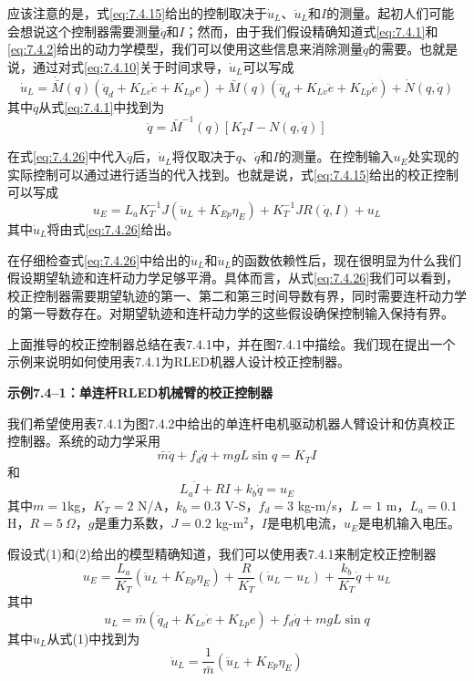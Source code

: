 \documentclass[UTF8]{ctexart}
\begin{document}
应该注意的是，式\eqref{eq:7.4.15}给出的控制取决于$\dot{u}_L$、$\ddot{u}_L$和$I$的测量。起初人们可能会想说这个控制器需要测量$\ddot{q}$和$I$；然而，由于我们假设精确知道式\eqref{eq:7.4.1}和\eqref{eq:7.4.2}给出的动力学模型，我们可以使用这些信息来消除测量$\ddot{q}$的需要。也就是说，通过对式\eqref{eq:7.4.10}关于时间求导，$\dot{u}_L$可以写成
\begin{equation}\label{eq:7.4.26}
\dot{u}_L = \dot{\bar{M}}(q)(\ddot{q}_d + K_{Lv}\dot{e} + K_{Lp}e) + \bar{M}(q)(\dddot{q}_d + K_{Lv}\ddot{e} + K_{Lp}\dot{e}) + \dot{N}(q,\dot{q})
\end{equation}
其中$\ddot{q}$从式\eqref{eq:7.4.1}中找到为
\begin{equation*}
\ddot{q} = \bar{M}^{-1}(q)[K_T I - N(q,\dot{q})]
\end{equation*}

在式\eqref{eq:7.4.26}中代入$\ddot{q}$后，$\dot{u}_L$将仅取决于$q$、$\dot{q}$和$I$的测量。在控制输入$u_E$处实现的实际控制可以通过进行适当的代入找到。也就是说，式\eqref{eq:7.4.15}给出的校正控制可以写成
\begin{equation}\label{eq:7.4.27}
u_E = L_a K_T^{-1}J(\ddot{u}_L + K_{Ep}\eta_E) + K_T^{-1}JR(\dot{q},I) + u_L
\end{equation}
其中$\dot{u}_L$将由式\eqref{eq:7.4.26}给出。

在仔细检查式\eqref{eq:7.4.26}中给出的$\dot{u}_L$和$\ddot{u}_L$的函数依赖性后，现在很明显为什么我们假设期望轨迹和连杆动力学足够平滑。具体而言，从式\eqref{eq:7.4.26}我们可以看到，校正控制器需要期望轨迹的第一、第二和第三时间导数有界，同时需要连杆动力学的第一导数存在。对期望轨迹和连杆动力学的这些假设确保控制输入保持有界。

上面推导的校正控制器总结在表7.4.1中，并在图7.4.1中描绘。我们现在提出一个示例来说明如何使用表7.4.1为RLED机器人设计校正控制器。

\textbf{示例7.4--1：单连杆RLED机械臂的校正控制器}

我们希望使用表7.4.1为图7.4.2中给出的单连杆电机驱动机器人臂设计和仿真校正控制器。系统的动力学采用
\begin{equation}
\bar{m}\ddot{q} + f_d \dot{q} + mgL \sin q = K_T I
\end{equation}
和
\begin{equation}
L_a \dot{I} + RI + k_b \dot{q} = u_E
\end{equation}
其中$m=1$kg，$K_T=2$ N/A，$k_b=0.3$ V-S，$f_d=3$ kg-m/s，$L=1$ m，$L_a=0.1$ H，$R=5\ \Omega$，$g$是重力系数，$J=0.2$ kg-m$^2$，$I$是电机电流，$u_E$是电机输入电压。

假设式(1)和(2)给出的模型精确知道，我们可以使用表7.4.1来制定校正控制器
\begin{equation}
u_E = \frac{L_a}{K_T}(\ddot{u}_L + K_{Ep}\eta_E) + \frac{R}{K_T}(\dot{u}_L - u_L) + \frac{k_b}{K_T}\dot{q} + u_L
\end{equation}
其中
\begin{equation}
u_L = \bar{m}(\ddot{q}_d + K_{Lv}\dot{e} + K_{Lp}e) + f_d \dot{q} + mgL \sin q
\end{equation}
其中$\ddot{u}_L$从式(1)中找到为
\begin{equation}
\ddot{u}_L = \frac{1}{\bar{m}}(\ddot{u}_L + K_{Ep}\eta_E)
\end{equation}
\end{document}
